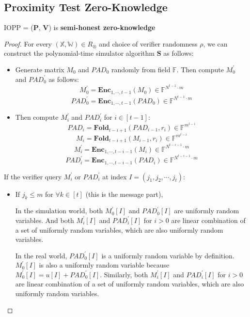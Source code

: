\subsection{Proximity Test Zero-Knowledge}

\begin{lemma}
\label{lemma:szkpc-zk}

IOPP = ($\textbf{P}$, $\textbf{V}$) is \textbf{semi-honest zero-knowledge}

\end{lemma}
\begin{proof}

For every $(\mathbb{X}, \mathbb{W}) \in R_\otimes$ and choice of verifier randomness $\rho$, we can construct the polynomial-time simulator algorithm $\textbf{S}$ as follows:


\begin{itemize}
    \item Generate matrix $M_0$ and $PAD_0$ randomly from field $\mathbb{F}$. Then compute $M_0^\prime$ and $PAD_0^\prime$ as follows:
    $$
        M_0^{\prime} = \textbf{Enc}_{1,\cdots,t-1}(M_0) \in \mathbb{F}^{N^{t-1} \cdot m}
    $$
    $$
        PAD_0^{\prime} = \textbf{Enc}_{1,\cdots,t-1}(PAD_0) \in \mathbb{F}^{N^{t-1} \cdot m}
    $$
    \item Then compute $M_i^{\prime}$ and $PAD_i^\prime$ for $i \in [t-1]$:
    $$
        PAD_i = \textbf{Fold}_{t-i+1}(PAD_{i-1}, r_i) \in \mathbb{F}^{m^{t-i}}
    $$
    $$
        M_i = \textbf{Fold}_{t-i+1}(M_{i-1}, r_i) \in \mathbb{F}^{m^{t-i}}
    $$
    $$
        M_i^\prime =  \textbf{Enc}_{1, \cdots, t- i - 1}(M_i) \in \mathbb{F}^{N^{t-i-1} \cdot m}
    $$
    $$
        PAD_i^\prime =  \textbf{Enc}_{1, \cdots, t- i - 1}(PAD_i) \in \mathbb{F}^{N^{t-i-1} \cdot m}
    $$
\end{itemize}

If the verifier query $M_i^{\prime}$ or $PAD_i^\prime$ at index $I = (j_1, j_2, \cdots, j_t)$:

\begin{itemize}
    \item If $j_k \le m$ for $\forall k \in [t]$ (this is the message part),
    
    In the simulation world, both $M_0^\prime[I]$ and $PAD_0^\prime[I]$ are uniformly random variables. And both $M_i^\prime[I]$ and $PAD_i^\prime[I]$ for $i > 0$ are linear combination of a set of uniformly random variables, which are also uniformly random variables.
    
    In the real world, $PAD_0^\prime[I]$ is a uniformly random variable by definition. $M_0^\prime[I]$ is also a uniformly random variable because $M_0^\prime[I] = u[I] + PAD_0^\prime[I]$. Similarly, both $M_i^\prime[I]$ and $PAD_i^\prime[I]$ for $i > 0$ are linear combination of a set of uniformly random variables, which are also uniformly random variables.
    

\end{itemize}
\end{proof}
